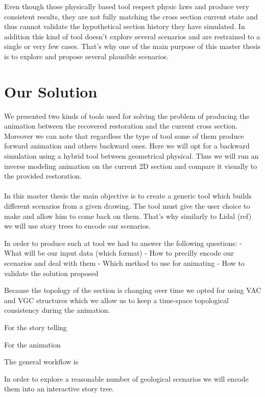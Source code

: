 \documentclass[12pt, a4paper]{memoir} %
\begin{document}
Even though those physically based tool respect physic laws and produce very consistent results, they are not fully matching the cross section current state and thus cannot validate the hypothetical section history they have simulated. In addition this kind of tool doesn't explore several scenarios and are restrained to a single or very few cases. 
That's why one of the main purpose of this master thesis is to explore and propose several plausible scenarios.

\section{Our Solution}

We presented two kinds of tools used for solving the problem of producing the animation between the recovered restoration and the current cross section. Moreover we can note that regardless the type of tool some of them produce forward animation and others backward ones. 
Here we will opt for a backward simulation using a hybrid tool between geometrical physical.
Thus we will run an inverse modeling animation on the current 2D section and compare it visually to the provided restoration.\\\\

In this master thesis the main objective is to create a generic tool which builds different scenarios from a given drawing. The tool must give the user choice to make and allow him to come back on them. That's why similarly to Lidal (ref) we will use story trees to encode our scenarios.

In order to produce such at tool we had to answer the following questions:
- What will be our input data (which format)
- How to precilly encode our scenarios and deal with them
- Which method to use for animating
- How to validate the solution proposed

Because the topology of the section is changing over time we opted for using VAC and VGC structures which we allow us to keep a time-space topological consistency during the animation.


For the story telling 

For the animation

The general workflow is


 In order to explore a reasonable number of geological scenarios we will encode them into an interactive story tree.\\\\
\end{document}
